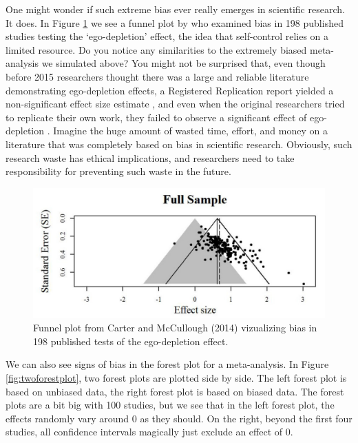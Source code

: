 \documentclass[
  oneside]{krantz}
\begin{document}
One might wonder if such extreme bias ever really emerges in scientific research. It does. In Figure \ref{fig:carterbias} we see a funnel plot by \citet{carter_publication_2014} who examined bias in 198 published studies testing the `ego-depletion' effect, the idea that self-control relies on a limited resource. Do you notice any similarities to the extremely biased meta-analysis we simulated above? You might not be surprised that, even though before 2015 researchers thought there was a large and reliable literature demonstrating ego-depletion effects, a Registered Replication report yielded a non-significant effect size estimate \citep{hagger_multilab_2016}, and even when the original researchers tried to replicate their own work, they failed to observe a significant effect of ego-depletion \citep{vohs_multisite_2021}. Imagine the huge amount of wasted time, effort, and money on a literature that was completely based on bias in scientific research. Obviously, such research waste has ethical implications, and researchers need to take responsibility for preventing such waste in the future.



\begin{figure}

{\centering \includegraphics[width=1\linewidth]{images/carterfunnel} 

}

\caption{Funnel plot from Carter and McCullough (2014) vizualizing bias in 198 published tests of the ego-depletion effect.}\label{fig:carterbias}
\end{figure}

We can also see signs of bias in the forest plot for a meta-analysis. In Figure \ref{fig:twoforestplot}, two forest plots are plotted side by side. The left forest plot is based on unbiased data, the right forest plot is based on biased data. The forest plots are a bit big with 100 studies, but we see that in the left forest plot, the effects randomly vary around 0 as they should. On the right, beyond the first four studies, all confidence intervals magically just exclude an effect of 0.
\end{document}
